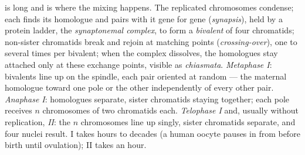 \begin{proposition}\label{prop:b2:meiosis-heredity:stages}
\emph{} is long and is where the mixing happens. The
replicated chromosomes condense; each finds its homologue and
pairs with it gene for gene (\emph{synapsis}), held by a protein
ladder, the \emph{synaptonemal complex}, to form a \emph{bivalent}
of four chromatids; non-sister chromatids break and rejoin at
matching points (\emph{crossing-over}), one to several times per
bivalent; when the complex dissolves, the homologues stay attached
only at these exchange points, visible as \emph{chiasmata}.
\emph{Metaphase I}: bivalents line up on the spindle, each pair
oriented at random --- the maternal homologue toward one pole or
the other independently of every other pair. \emph{Anaphase I}:
homologues separate, sister chromatids staying together; each pole
receives $n$ chromosomes of two chromatids each. \emph{Telophase I}
and, usually without replication, \emph{ II}: the $n$
chromosomes line up singly, sister chromatids separate, and four
 nuclei result.  I takes hours to decades (a human
oocyte pauses in  from before birth until ovulation);
 II takes an hour.
\end{proposition}

